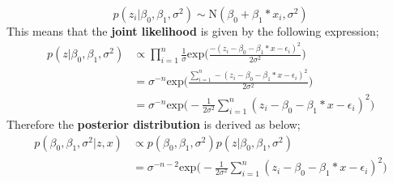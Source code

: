 \documentclass{article}
\begin{document}
$$p(z_i|\beta_0, \beta_1, \sigma^2) \sim \text{N}(\beta_0 + \beta_1*x_i, \sigma^2)$$
This means that the \textbf{joint likelihood} is given by the following expression;
\begin{align*}
p(z|\beta_0, \beta_1, \sigma^2) &\propto \prod_{i=1}^{n}\frac{1}{\sigma} \text{exp}\Big(\frac{-(z_i - \beta_0 - \beta_1*x  -\epsilon_i)^2}{2\sigma^2}\Big)\\
&= \sigma^{-n} \text{exp}\Big(\frac{\sum_{i = 1}^{n}-(z_i - \beta_0 - \beta_1*x  -\epsilon_i)^2}{2\sigma^2}\Big)\\
 &= \sigma^{-n} \text{exp}\Big(-\frac{1}{2\sigma^2}\sum_{i = 1}^{n}(z_i - \beta_0 - \beta_1*x  -\epsilon_i)^2\Big)
\end{align*}
\newpage
Therefore the \textbf{posterior distribution} is derived as below;
\begin{align*}
p(\beta_0,\beta_1,\sigma^2 | z,x) &\propto p(\beta_0, \beta_1, \sigma^2) p(z|\beta_0, \beta_1, \sigma^2)\\
&= \sigma^{-n-2} \text{exp}\Big(-\frac{1}{2\sigma^2}\sum_{i = 1}^{n}(z_i - \beta_0 - \beta_1*x  -\epsilon_i)^2\Big)
\end{align*}
\end{document}
